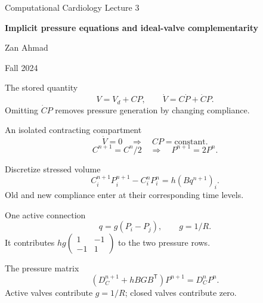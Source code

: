 \documentclass[aspectratio=169,11pt]{beamer}
\newcommand{\notestarget}{notes.pdf}\newcommand{\noteslabel}{Notes}
\begin{document}
\begin{frame}[plain]\vfill
{\small\color{accent} Computational Cardiology \quad Lecture 3}\par\medskip
{\raggedright{}\LARGE\bfseries\color{ink} Implicit pressure equations and ideal-valve complementarity}\par\bigskip
Zan Ahmad\par\smallskip
{\small Fall 2024}\par\vfill\end{frame}
\renewcommand{\notestarget}{notes.pdf\#note-differentiating-the-constitutive-storage-law}
\begin{frame}[t,fragile,label=slide-the-stored-quantity]{The stored quantity}
\[V=V_d+CP,\qquad \dot V=C\dot P+\dot CP.\]\pause{} Omitting $\dot CP$ removes pressure generation by changing compliance.
\end{frame}
\renewcommand{\notestarget}{notes.pdf\#note-differentiating-the-constitutive-storage-law}
\begin{frame}[t,fragile,label=slide-an-isolated-contracting-compartment]{An isolated contracting compartment}
\[\dot V=0\quad\Longrightarrow\quad CP=\text{constant}.\]\pause{}\[C^{n+1}=C^n/2\quad\Longrightarrow\quad P^{n+1}=2P^n.\]
\end{frame}
\renewcommand{\notestarget}{notes.pdf\#note-the-conductance-laplacian-and-pressure-matrix}
\begin{frame}[t,fragile,label=slide-discretize-stressed-volume]{Discretize stressed volume}
\[C_i^{n+1}P_i^{n+1}-C_i^nP_i^n=h(Bq^{n+1})_i.\]\pause{} Old and new compliance enter at their corresponding time levels.
\end{frame}
\renewcommand{\notestarget}{notes.pdf\#note-the-conductance-laplacian-and-pressure-matrix}
\begin{frame}[t,fragile,label=slide-one-active-connection]{One active connection}
\[q=g(P_i-P_j),\qquad g=1/R.\]\pause{} It contributes $hg\begin{pmatrix}1&-1\\-1&1\end{pmatrix}$ to the two pressure rows.
\end{frame}
\renewcommand{\notestarget}{notes.pdf\#note-the-conductance-laplacian-and-pressure-matrix}
\begin{frame}[t,fragile,label=slide-the-pressure-matrix]{The pressure matrix}
\[(D_C^{n+1}+hBGB^{\mathsf T})P^{n+1}=D_C^nP^n.\]\pause{} Active valves contribute $g=1/R$; closed valves contribute zero.
\end{frame}
\end{document}
